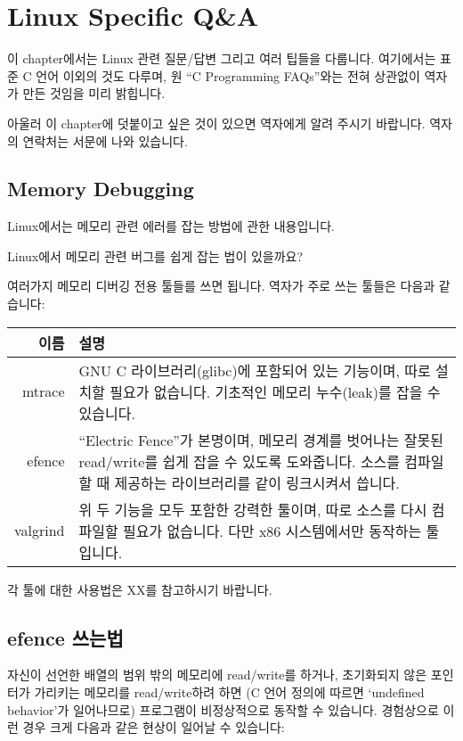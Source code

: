 \chapter{Linux Specific Q\&A}	\label{chap:linux}

이 chapter에서는 Linux 관련 질문/답변 그리고 여러 팁들을 다룹니다. 
여기에서는 표준 C 언어 이외의 것도 다루며,
원 ``C Programming FAQs''와는 전혀 상관없이 역자가 만든 것임을 미리 밝힙니다.

아울러 이 chapter에 덧붙이고 싶은 것이 있으면 역자에게 알려 주시기 바랍니다. 
역자의 연락처는 서문에 나와 있습니다.

\section{Memory Debugging}	\label{sec:lmemdebug}
Linux에서는 메모리 관련 에러를 잡는 방법에 관한 내용입니다.

\begin{faq}
\q Linux에서 메모리 관련 버그를 쉽게 잡는 법이 있을까요?

\A 여러가지 메모리 디버깅 전용 툴들를 쓰면 됩니다. 역자가 주로 쓰는 툴들은 다음과 같습니다:

\begin{center}
\begin{tabular}{r|p{12cm}} \hline
이름    & 설명  \\ \hline
mtrace  & GNU C 라이브러리(glibc)에 포함되어 있는 기능이며, 
        따로 설치할 필요가 없습니다. 기초적인 메모리 누수(leak)를 잡을 수 있습니다. \\
efence  & ``Electric Fence''가 본명이며, 메모리 경계를 벗어나는 잘못된 read/write를
        쉽게 잡을 수 있도록 도와줍니다. 소스를 컴파일할 때 제공하는 라이브러리를 같이
        링크시켜서 씁니다. \\
valgrind        & 위 두 기능을 모두 포함한 강력한 툴이며, 따로 소스를 다시 컴파일할 필요가
        없습니다. 다만 x86 시스템에서만 동작하는 툴입니다.  \\ \hline
\end{tabular}
\end{center}

각 툴에 대한 사용법은 XX를 참고하시기 바랍니다.
\end{faq}

\section{efence 쓰는법}
자신이 선언한 배열의 범위 밖의 메모리에 read/write를 하거나, 초기화되지 않은 포인터가
가리키는 메모리를 read/write하려 하면 (C 언어 정의에 따르면 `undefined behavior'가
일어나므로) 프로그램이 비정상적으로 동작할 수 있습니다.  경험상으로 이런 경우 크게 다음과 같은
현상이 일어날 수 있습니다:

